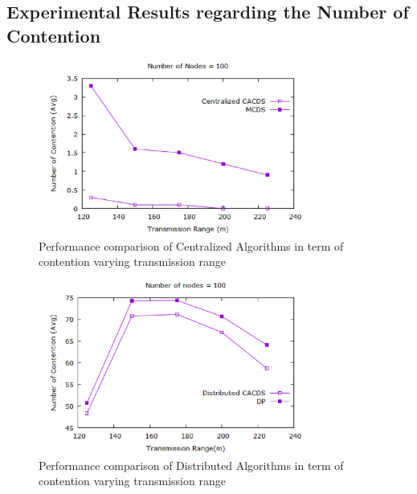 \subsection{Experimental Results regarding the Number of Contention}
\begin{figure}[h]
    \centering
    \includegraphics[width=90mm, height=57mm]{Figures/outc100c.eps}
    \caption{Performance comparison of Centralized Algorithms in term of contention varying transmission range}
    \label{outc100c}
    \end{figure}
    \begin{figure}[h]
    \centering
    \includegraphics[width=90mm, height=57mm]{Figures/outc100d.eps}
    \caption{Performance comparison of Distributed Algorithms in term of contention varying transmission range}
    \label{outc100d}
\end{figure}

